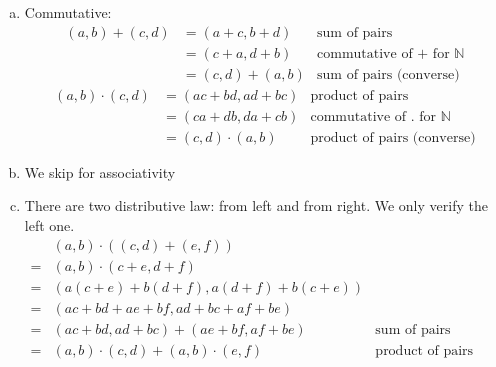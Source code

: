 \documentclass[b5paper]{article}
\begin{document}
\begin{Answer}[ref={ex:zero}]
{  \begin{enumerate}[(a)]
  \item Commutative:
    \begin{align*}
      (a, b) + (c, d) & = (a + c, b + d)  & \text{sum of pairs} \\
                      & = (c + a, d + b)  & \text{commutative of + for } \mathbb{N}\\
                      & = (c, d) + (a, b) & \text{sum of pairs (converse)}
    \end{align*}
    \begin{align*}
      (a, b) \cdot (c, d) & = (ac + bd, ad + bc) & \text{product of pairs} \\
                          & = (ca + db, da + cb) & \text{commutative of . for } \mathbb{N} \\
                          & = (c, d) \cdot (a, b) & \text{product of pairs (converse)}
    \end{align*}
  \item We skip for associativity
  \item There are two distributive law: from left and from right. We only verify the left one.
    \begin{align*}
         &(a, b) \cdot ((c, d) + (e, f)) & \\
        =& (a, b) \cdot (c + e, d + f) & \\
        =& (a(c + e) + b (d + f), a(d + f) + b(c + e)) & \\
        =& (ac + bd + ae + bf, ad + bc + af + be) & \\
        =& (ac + bd, ad + bc) + (ae + bf, af + be) & \text{sum of pairs (converse)} \\
        =& (a, b) \cdot (c, d) + (a, b) \cdot (e, f) & \text{product of pairs (converse)}
    \end{align*}
  \end{enumerate}
}



\end{Answer}
\end{document}
